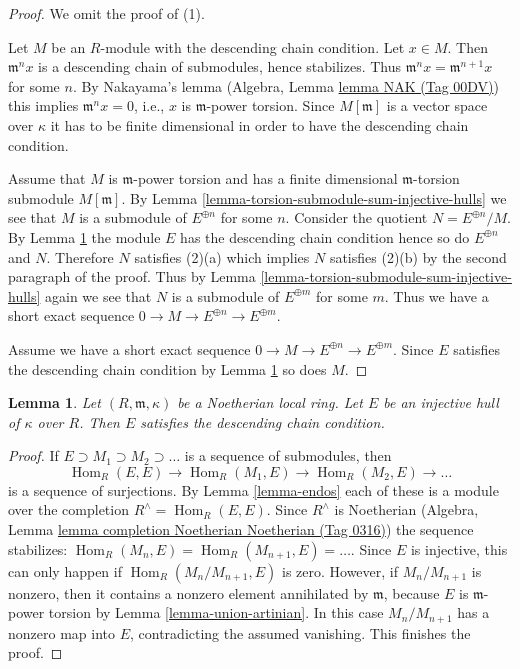 \documentclass{amsart}
\theoremstyle{plain}
\newtheorem{lemma}[subsection]{Lemma}
\theoremstyle{definition}
\theoremstyle{remark}
\numberwithin{equation}{subsection}
\def\Hom{\mathop{\mathrm{Hom}}\nolimits}
\begin{document}
\begin{proof}
We omit the proof of (1).

\medskip\noindent
Let $M$ be an $R$-module with the descending chain condition. Let $x \in M$.
Then $\mathfrak m^n x$ is a descending chain of submodules, hence stabilizes.
Thus $\mathfrak m^nx = \mathfrak m^{n + 1}x$ for some $n$. By Nakayama's lemma
(Algebra, Lemma \href{https://stacks.math.columbia.edu/tag/00DV}{lemma NAK (Tag 00DV)}) this implies $\mathfrak m^n x = 0$,
i.e., $x$ is $\mathfrak m$-power torsion. Since $M[\mathfrak m]$ is a vector
space over $\kappa$ it has to be finite dimensional in order to have the
descending chain condition.

\medskip\noindent
Assume that $M$ is $\mathfrak m$-power torsion and has a finite dimensional
$\mathfrak m$-torsion submodule $M[\mathfrak m]$. By
Lemma \ref{lemma-torsion-submodule-sum-injective-hulls}
we see that $M$ is a submodule of $E^{\oplus n}$ for some $n$.
Consider the quotient $N = E^{\oplus n}/M$. By
Lemma \ref{lemma-injective-hull-has-dcc} the module $E$ has the
descending chain condition hence so do $E^{\oplus n}$ and $N$.
Therefore $N$ satisfies (2)(a) which implies $N$ satisfies
(2)(b) by the second paragraph of the proof. Thus by
Lemma \ref{lemma-torsion-submodule-sum-injective-hulls}
again we see that $N$ is a submodule of $E^{\oplus m}$ for some $m$.
Thus we have a short exact sequence
$0 \to M \to E^{\oplus n} \to E^{\oplus m}$.

\medskip\noindent
Assume we have a short exact sequence
$0 \to M \to E^{\oplus n} \to E^{\oplus m}$.
Since $E$ satisfies the descending chain condition by
Lemma \ref{lemma-injective-hull-has-dcc}
so does $M$.
\end{proof}


\begin{lemma}
\label{lemma-injective-hull-has-dcc}
Let $(R, \mathfrak m, \kappa)$ be a Noetherian local ring.
Let $E$ be an injective hull of $\kappa$ over $R$. Then
$E$ satisfies the descending chain condition.
\end{lemma}

\begin{proof}
If $E \supset M_1 \supset M_2 \supset \ldots$ is a sequence of submodules, then
$$
\Hom_R(E, E) \to \Hom_R(M_1, E) \to \Hom_R(M_2, E) \to \ldots
$$
is a sequence of surjections. By Lemma \ref{lemma-endos} each of these is a
module over the completion $R^\wedge = \Hom_R(E, E)$.
Since $R^\wedge$ is Noetherian
(Algebra, Lemma \href{https://stacks.math.columbia.edu/tag/0316}{lemma completion Noetherian Noetherian (Tag 0316)})
the sequence stabilizes: $\Hom_R(M_n, E) = \Hom_R(M_{n + 1}, E) = \ldots$.
Since $E$ is injective, this can only happen if $\Hom_R(M_n/M_{n + 1}, E)$
is zero. However, if $M_n/M_{n + 1}$ is nonzero, then it contains a
nonzero element annihilated by $\mathfrak m$, because $E$ is
$\mathfrak m$-power torsion by Lemma \ref{lemma-union-artinian}.
In this case $M_n/M_{n + 1}$ has a nonzero map into $E$, contradicting
the assumed vanishing. This finishes the proof.
\end{proof}
\end{document}
